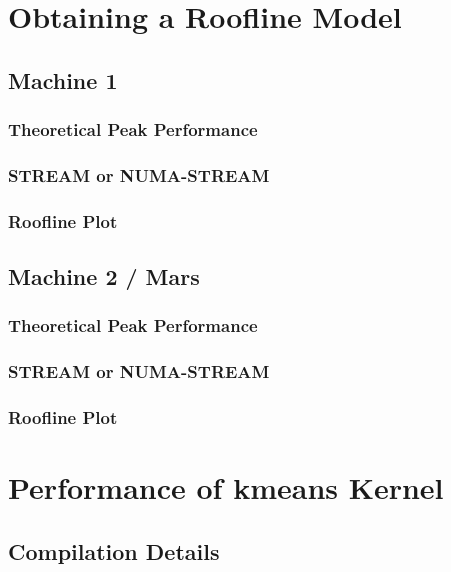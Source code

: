 
\lstset{
	basicstyle=\small,
	language=C
}

\section{Obtaining a Roofline Model}

\subsection{Machine 1}

\subsubsection{Theoretical Peak Performance}

\subsubsection{STREAM or NUMA-STREAM}

\subsubsection{Roofline Plot}


\subsection{Machine 2 / Mars}

\subsubsection{Theoretical Peak Performance}

\subsubsection{STREAM or NUMA-STREAM}

\subsubsection{Roofline Plot}


\section{Performance of kmeans Kernel}

\subsection{Compilation Details}

